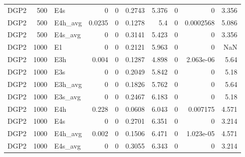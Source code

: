 \begin{table}[!htbp]
{\begin{tabular}{lrlrrrrrrr}
DGP2 & 500 & E4s & 0 & 0 & 0.2743 & 5.376 & 0 & 0 & 3.356 \\
DGP2 & 500 & E4h_avg & 0.0235 & 0 & 0.1278 & 5.4 & 0 & 0.0002568 & 5.086 \\
DGP2 & 500 & E4s_avg & 0 & 0 & 0.3141 & 5.423 & 0 & 0 & 3.356 \\
DGP2 & 1000 & E1 & 0 & 0 & 0.2121 & 5.963 & 0 & 0 & NaN \\
DGP2 & 1000 & E3h & 0.004 & 0 & 0.1287 & 4.898 & 0 & 2.063e-06 & 5.64 \\
DGP2 & 1000 & E3s & 0 & 0 & 0.2049 & 5.842 & 0 & 0 & 5.18 \\
DGP2 & 1000 & E3h_avg & 0 & 0 & 0.1826 & 5.762 & 0 & 0 & 5.64 \\
DGP2 & 1000 & E3s_avg & 0 & 0 & 0.2467 & 6.183 & 0 & 0 & 5.18 \\
DGP2 & 1000 & E4h & 0.228 & 0 & 0.0608 & 6.043 & 0 & 0.007175 & 4.571 \\
DGP2 & 1000 & E4s & 0 & 0 & 0.2701 & 6.351 & 0 & 0 & 3.214 \\
DGP2 & 1000 & E4h_avg & 0.002 & 0 & 0.1506 & 6.471 & 0 & 1.023e-05 & 4.571 \\
DGP2 & 1000 & E4s_avg & 0 & 0 & 0.3055 & 6.343 & 0 & 0 & 3.214 \\
\bottomrule
\end{tabular}
}
\end{table}
